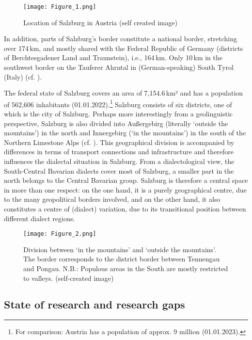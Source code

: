 \documentclass[output=paper,colorlinks, citecolor=brown]{langscibook}
\begin{document}
\begin{figure}
\texttt{[image: Figure\_1.png]}
\caption{\label{fig:blaßnigg:1}Location of Salzburg in Austria (self created image)}
\end{figure}

In addition, parts of Salzburg’s border constitute a national border, stretching over 174\,km, and mostly shared with the Federal Republic of Germany (districts of Berchtesgadener Land and Traunstein), i.e., 164\,km. Only 10\,km in the southwest border on the Tauferer Ahrntal in (German-speaking) South Tyrol (Italy) (cf. \citealt{LandesstatistikSalzburg2022}).

The federal state of Salzburg covers an area of 7,154.6\,km² and has a population of 562,606 inhabitants (01.01.2022).\footnote{For comparison: Austria has a population of approx. 9 million (01.01.2023).} Salzburg consists of six districts, one of which is the city of Salzburg. Perhaps more interestingly from a geolinguistic perspective, Salzburg is also divided into Außergebirg (literally `outside the mountains') in the north and Innergebirg (`in the mountains') in the south of the Northern Limestone Alps (cf. ). This geographical division is accompanied by differences in terms of transport connections and infrastructure and therefore influences the dialectal situation in Salzburg. From a dialectological view, the South-Central Bavarian dialects cover most of Salzburg, a smaller part in the north belongs to the Central Bavarian group. Salzburg is therefore a central space in more than one respect: on the one hand, it is a purely geographical centre, due to the many geopolitical borders involved, and on the other hand, it also constitutes a centre of (dialect) variation, due to its transitional position between different dialect regions.\largerpage[-2]

\begin{figure}
\texttt{[image: Figure\_2.png]}
\caption{\label{fig:blaßnigg:2}Division between ‘in the mountains’ and ‘outside the mountains’. The border corresponds to the district border between Tennengau and Pongau. N.B.: Populous areas in the South are mostly restricted to valleys. (self-created image)}
\end{figure}

\subsection{State of research and research gaps} \label{sec:blaßnigg:1.3}
\end{document}
